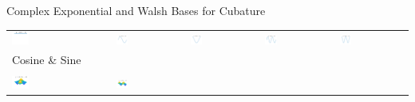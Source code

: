 \documentclass[11pt,compress,xcolor={usenames,dvipsnames},aspectratio=169]{beamer}
\begin{document}
\begin{frame}{Complex Exponential and Walsh Bases for Cubature}
\vspace{-3ex}
	\begin{tabular}{>{\centering}m{}>{\centering}m{}>{\centering}m{}>{\centering}m{}>{\centering}m{}}
		\includegraphics[width =0.18\textwidth]{ProgramsImages/CosineSine_Degree_0.png}  &
		\includegraphics[width =0.18\textwidth]{ProgramsImages/CosineSine_Degree_1.png}  &
		\includegraphics[width =0.18\textwidth]{ProgramsImages/CosineSine_Degree_2.png}  &
		\includegraphics[width =0.18\textwidth]{ProgramsImages/CosineSine_Degree_3.png}  &
		\includegraphics[width =0.18\textwidth]{ProgramsImages/CosineSine_Degree_4.png} 
	\tabularnewline[-7ex]
	Cosine \& Sine
	\tabularnewline
	\tabularnewline
		\includegraphics[width =0.18\textwidth]{ProgramsImages/CosineSine_Degree_1_1.png}  &
\includegraphics[width =0.18\textwidth]{ProgramsImages/CosineSine_Degree_1_2.png}  &

\end{tabular}
\end{frame}
\end{document}
